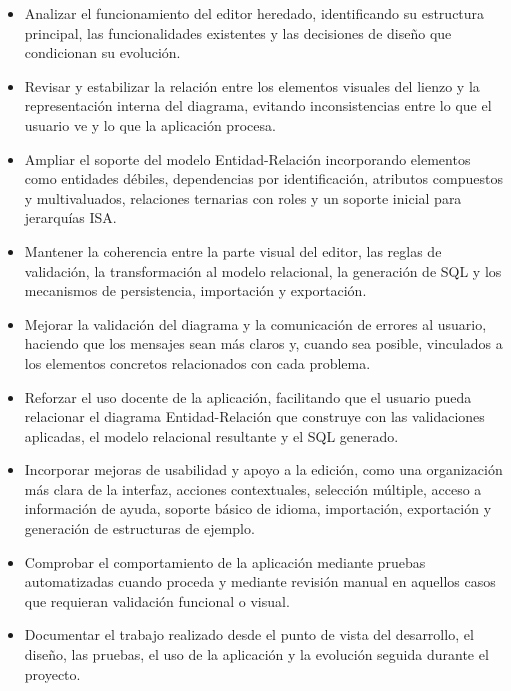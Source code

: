 \begin{itemize}
\item Analizar el funcionamiento del editor heredado, identificando su estructura principal, las funcionalidades existentes y las decisiones de diseño que condicionan su evolución.

\item Revisar y estabilizar la relación entre los elementos visuales del lienzo y la representación interna del diagrama, evitando inconsistencias entre lo que el usuario ve y lo que la aplicación procesa.

\item Ampliar el soporte del modelo Entidad-Relación incorporando elementos como entidades débiles, dependencias por identificación, atributos compuestos y multivaluados, relaciones ternarias con roles y un soporte inicial para jerarquías ISA.

\item Mantener la coherencia entre la parte visual del editor, las reglas de validación, la transformación al modelo relacional, la generación de SQL y los mecanismos de persistencia, importación y exportación.

\item Mejorar la validación del diagrama y la comunicación de errores al usuario, haciendo que los mensajes sean más claros y, cuando sea posible, vinculados a los elementos concretos relacionados con cada problema.

\item Reforzar el uso docente de la aplicación, facilitando que el usuario pueda relacionar el diagrama Entidad-Relación que construye con las validaciones aplicadas, el modelo relacional resultante y el SQL generado.

\item Incorporar mejoras de usabilidad y apoyo a la edición, como una organización más clara de la interfaz, acciones contextuales, selección múltiple, acceso a información de ayuda, soporte básico de idioma, importación, exportación y generación de estructuras de ejemplo.

\item Comprobar el comportamiento de la aplicación mediante pruebas automatizadas cuando proceda y mediante revisión manual en aquellos casos que requieran validación funcional o visual.

\item Documentar el trabajo realizado desde el punto de vista del desarrollo, el diseño, las pruebas, el uso de la aplicación y la evolución seguida durante el proyecto.
\end{itemize}